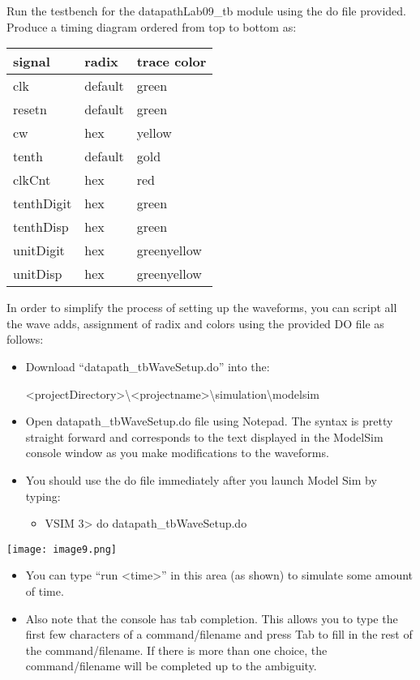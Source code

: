 \hypertarget{link:swDpSim}{}{{}
Run the testbench for the datapathLab09\_tb module using the do file
provided. Produce a timing diagram ordered from top to bottom as:

\begin{tabular}{p{3cm}p{3cm}p{3cm}}
signal & radix & trace color \\ \hline
  clk 		& default 	& green  \\
  resetn 		& default 	& green  \\
  cw 		& hex 		& yellow  \\
  tenth 		& default 	& gold  \\
  clkCnt 		& hex 		& red  \\
  tenthDigit 	& hex 		& green  \\
  tenthDisp 	& hex 		& green  \\
  unitDigit 	& hex 		& greenyellow  \\
  unitDisp 	& hex 		& greenyellow  \\
\end{tabular}

In order to simplify the process of setting up the waveforms, you can
script all the wave adds, assignment of radix and colors using the
provided DO file as follows:

\begin{itemize}
\item
  Download ``datapath\_tbWaveSetup.do'' into the:
  
  \textless projectDirectory\textgreater\textbackslash\textless projectname\textgreater\textbackslash simulation\textbackslash modelsim
\item
  Open datapath\_tbWaveSetup.do file using Notepad. The syntax is pretty
  straight forward and corresponds to the text displayed in the ModelSim
  console window as you make modifications to the waveforms.
\item
  You should use the do file immediately after you launch Model Sim by
  typing:

  \begin{itemize}
  \item
    VSIM 3\textgreater{} do datapath\_tbWaveSetup.do
  \end{itemize}
\end{itemize}


\texttt{[image:  image9.png]}


\begin{itemize}
\item
  You can type ``run \textless time\textgreater'' in this area (as
  shown) to simulate some amount of time. 
\item
  Also note that the console has tab completion. This allows you to type
  the first few characters of a command/filename and press Tab to fill
  in the rest of the command/filename. If there is more than one choice,
  the command/filename will be completed up to the ambiguity.
\end{itemize}

}
